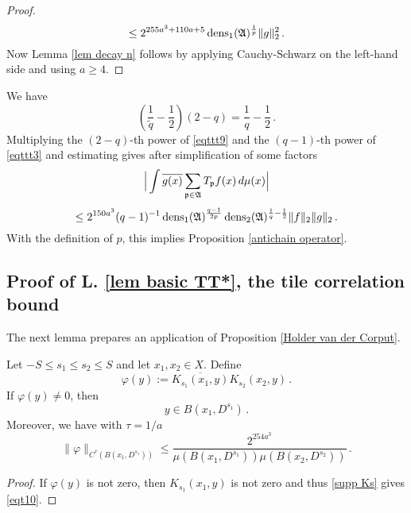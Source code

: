 {\begin{proof}
\begin{equation}
    \le  2^{255a^3+110a + 5} \operatorname{\operatorname{dens}}_1(\mathfrak{A})^{\frac 1p}
    \|g\|_2^2\,.
\end{equation}
Now Lemma \ref{lem decay n} follows by applying Cauchy-Schwarz on the left-hand side and using
$a\ge 4$.
\end{proof}
We have
\begin{equation}
    \left (\frac 1{\tilde{q}} -\frac 12\right) (2-q)= \frac 1q -\frac 12\,.
\end{equation}
Multiplying  the $(2-q)$-th power of  \eqref{eqttt9} and the $(q-1)$-th power of \eqref{eqttt3}
and estimating gives after simplification of some factors
\begin{equation}\label{eqttt8}
    \Big|\int \overline{g(x)} \sum_{\mathfrak p \in \mathfrak{A}} T_{\mathfrak p} f(x)\, d\mu(x)\Big|
\end{equation}
 \begin{equation}
    \le  2^{150a^3}({q}-1)^{-1} \operatorname{\operatorname{dens}}_1(\mathfrak{A})^{\frac {q-1}{2p}}\operatorname{\operatorname{dens}}_2(\mathfrak{A})^{\frac 1{q}-\frac 12}  \|f\|_2\|g\|_2\, .
\end{equation}
With the definition of $p$, this  implies
Proposition \ref{antichain operator}.


\subsection{Proof of L. \ref{lem basic TT*}, the tile correlation bound }\label{sec tile operator}

The next lemma prepares an application of
Proposition \ref{Holder van der Corput}.
\begin{lemma}\label{lem ksquare}
Let $-S\le s_1\le s_2\le S$ and let $x_1,x_2\in X$.
Define \begin{equation}
 \varphi(y) :=  \overline{K_{s_1}(x_1, y)}
 K_{s_2}(x_2, y) \, .
\end{equation}
If $\varphi(y)\neq 0$, then
\begin{equation}\label{eqt10}
    y\in B(x_1, D^{s_1})\, .
\end{equation}
Moreover, we have with $\tau = 1/a$
\begin{equation}\label{eqt11}
  \|\varphi\|_{C^\tau(B(x_1, D^{s_1}))}\le
\frac{2^{254 a^3}}{\mu(B(x_1, D^{s_1}))\mu(B(x_2, D^{s_2}))}
      \, .
\end{equation}

\end{lemma}
\begin{proof}

If $\varphi(y)$ is not zero, then $K_{s_1}(x_1, y)$ is not zero and thus
\eqref{supp Ks} gives \eqref{eqt10}.


\end{proof}}
